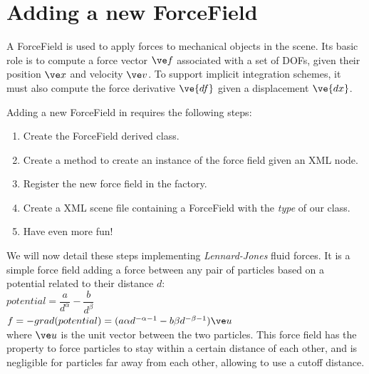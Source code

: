 \section{Adding a new ForceField}

A ForceField is used to apply forces to mechanical objects in the scene. Its basic role is to compute a force vector $\ve f$ associated with a set of DOFs, given their position $\ve x$ and velocity $\ve v$. To support implicit integration schemes, it must also compute the force derivative $\ve{df}$ given a displacement $\ve {dx}$.

Adding a new ForceField in \sofa{} requires the following steps:

\begin{enumerate}
\item Create the ForceField derived class.
\item Create a method to create an instance of the force field given an XML node.
\item Register the new force field in the  factory.
\item Create a XML scene file containing a ForceField with the \textit{type} of our class.
\item Have even more fun!
\end{enumerate}

We will now detail these steps implementing \textit{Lennard-Jones} fluid forces. It is a simple force field adding a force between any pair of particles based on a potential related to their distance $d$:\\
$potential = \dfrac{a}{d^\alpha} - \dfrac{b}{d^\beta}$\\
$f = - grad(potential) = ( a \alpha d^{-\alpha-1} - b \beta d^{-\beta-1} ) \ve u$\\
where $\ve u$ is the unit vector between the two particles. This force field has the property to force particles to stay within a certain distance of each other, and is negligible for particles far away from each other, allowing to use a cutoff distance.

